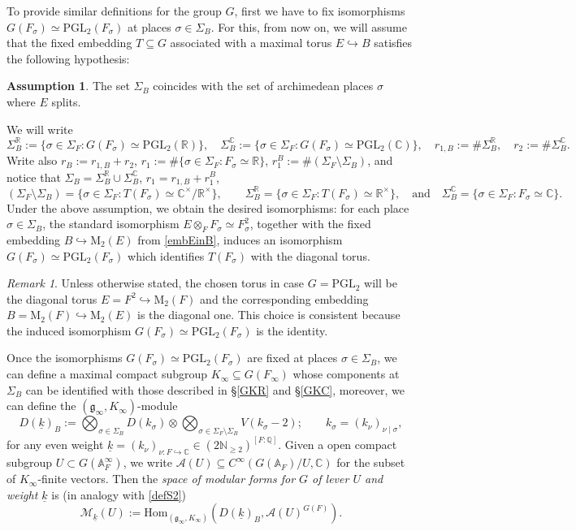 \documentclass{amsart}
\theoremstyle{definition}
\newtheorem{assumption}[theorem]{Assumption}
\theoremstyle{remark}
\newtheorem{remark}[theorem]{Remark}
\numberwithin{equation}{section}
\newcommand{\M}{\mathrm{M}}
\newcommand{\PGL}{{\mathrm{PGL}}}
\newcommand{\GL}{{\mathrm{GL}}}
\newcommand{\A}{{\mathbb A}}
\newcommand{\Q}{{\mathbb Q}}
\newcommand{\C}{{\mathbb C}}
\newcommand{\R}{{\mathbb R}}
\newcommand{\N}{{\mathbb N}}
\newcommand{\cA}{{\mathcal A}}
\newcommand{\cM}{{\mathcal M}}
\newcommand{\mfg}{{\mathfrak g}}
\newcommand{\Hom}{{\mathrm {Hom}}}
\begin{document}
To provide similar definitions for the group $G$, first we have to fix isomorphisms $G(F_\sigma)\simeq \PGL_2(F_\sigma)$ at places $\sigma\in\Sigma_B$.  For this, from now on, we will assume that the fixed embedding $T\subseteq G$ associated with a maximal torus $E\hookrightarrow B$ satisfies the following hypothesis:
\begin{assumption}\label{assuSigmaSigma}
The set $\Sigma_B$ coincides with the set of archimedean places $\sigma$ where $E$ splits.
\end{assumption}
We will write 
\[
\Sigma_B^\R:=\{\sigma\in\Sigma_F\colon G(F_\sigma)\simeq\PGL_2(\R)\},\quad\Sigma_B^\C:=\{\sigma\in\Sigma_F \colon G(F_\sigma)\simeq\PGL_2(\C)\},\quad r_{1,B}:=\#\Sigma_B^\R, \quad r_2:=\#\Sigma_B^\C.
\]
Write also $r_B:=r_{1,B}+r_2$, $r_1:=\#\{\sigma\in\Sigma_F \colon F_\sigma\simeq\R\}$, $r_1^B:=\#(\Sigma_F\setminus\Sigma_B)$, and notice that $\Sigma_B=\Sigma_B^\R\cup\Sigma_B^\C$, $r_1=r_{1,B}+r_1^B$,
\[
(\Sigma_F\setminus\Sigma_B)=\{\sigma\in\Sigma_F\colon T(F_\sigma)\simeq\C^\times/\R^\times\},\qquad \Sigma_B^\R=\{\sigma\in\Sigma_F\colon T(F_\sigma)\simeq\R^\times\},\quad\mbox{and}\quad\Sigma_B^\C=\{\sigma\in\Sigma_F\colon F_\sigma\simeq\C\}.%
\]
Under the above assumption, we obtain the desired isomorphisms: for each place $\sigma \in \Sigma_B$, the standard isomorphism $E \otimes_F F_\sigma \simeq F_\sigma^2$, together with the fixed embedding $B \hookrightarrow \M_2(E)$ from \eqref{embEinB}, induces an isomorphism $G(F_\sigma)\simeq\PGL_2(F_\sigma)$ which identifies $T(F_\sigma)$ with the diagonal torus.
\begin{remark}
    Unless otherwise stated, the chosen torus in case $G=\PGL_2$ will be the diagonal torus $E=F^2\hookrightarrow\M_2(F)$ and the corresponding embedding $B=\M_2(F)\hookrightarrow \M_2(E)$ is the diagonal one. This choice is consistent because the induced isomorphism $G(F_\sigma)\simeq\PGL_2(F_\sigma)$ is the identity.
\end{remark}
Once the isomorphisms $G(F_\sigma)\simeq\PGL_2(F_\sigma)$ are fixed at places $\sigma\in\Sigma_B$, we can define a maximal compact subgroup $K_\infty\subseteq G(F_\infty)$ whose components at $\Sigma_B$ can be identified with those described in \S \ref{GKR} and \S \ref{GKC}, moreover, we can define the $(\mfg_\infty,K_\infty)$-module
\[
D(\underline k)_B:=\bigotimes_{\sigma\in\Sigma_B} D(k_\sigma)\otimes\bigotimes_{\sigma\in\Sigma_F\setminus\Sigma_B}V(k_\sigma-2);\qquad k_\sigma=(k_\nu)_{\nu\mid\sigma},
\]
for any even weight $\underline k=(k_{\nu})_{\nu:F\hookrightarrow\C}\in (2\N_{\geq 2})^{[F:\Q]}$.
Given a open compact subgroup $U\subset G(\A_F^\infty)$, we  write $\cA(U)\subseteq C^\infty(G(\A_F)/U,\C)$ for the subset of $K_\infty$-finite vectors.
Then the \emph{space of modular forms for $G$ of lever $U$ and weight $\underline k$} is (in analogy with \eqref{defS2})
\[
\cM_{\underline k}(U):=\Hom_{(\mfg_\infty,K_\infty)}\left(D(\underline k)_B,\cA(U)^{G(F)}\right).
\]
\end{document}
